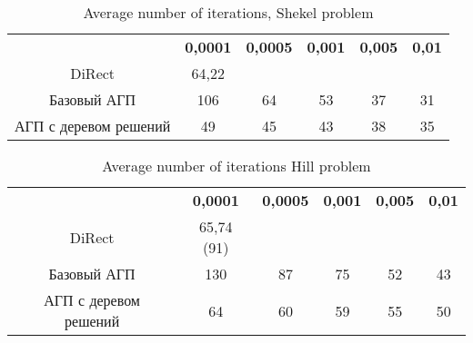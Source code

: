 \documentclass[entropy,article,submit,moreauthors,pdftex]{Definitions/mdpi}
\begin{document}
\begin{table}[]
	\caption{Average number of iterations, Shekel problem}\label{table:average_Shekel}
	\center
\begin{tabular}{cccccc}
\hline\noalign{\smallskip}
                                                    & \textbf{0,0001} & \textbf{0,0005} & \textbf{0,001} & \textbf{0,005} & \textbf{0,01} \\
DiRect                                              & 64,22                                   &                                         &                                        &                                        &                                       \\
Базовый АГП                                         & 106                                     & 64                                      & 53                                     & 37                                     & 31                                    \\
АГП с деревом решений & 49                                      & 45                                      & 43                                     & 38                                     & 35                                   

\end{tabular}
\end{table}

\begin{table}[]
	\caption{Average number of iterations Hill problem}\label{table:average_Hill}
	\center
\begin{tabular}{cccccc}
\hline\noalign{\smallskip}
                      & \textbf{0,0001} & \textbf{0,0005} & \textbf{0,001} & \textbf{0,005} & \textbf{0,01} \\
DiRect                & 65,74 (91)                              &                                         &                                        &                                        &                                       \\
Базовый АГП           & 130                                     & 87                                      & 75                                     & 52                                     & 43                                    \\
АГП с деревом решений & 64                                      & 60                                      & 59                                     & 55                                     & 50                                   
\end{tabular}
\end{table}
\end{document}
